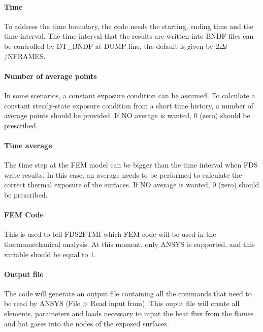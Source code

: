 \documentclass[11pt]{book}
\begin{document}
\paragraph{Time} 
To address the time boundary, the code needs the starting, ending time and the time interval. The time interval that the results are written into {\ct BNDF} files can be controlled by {\ct DT\_BNDF} at {\ct DUMP} line, the default is given by $2 \Delta t$/{\footnotesize NFRAMES}.
\paragraph{Number of average points} 
In some scenarios, a constant exposure condition can be assumed. To calculate a constant steady-state exposure condition from 
a short time history, a number of average points should be provided. If NO average is wanted, 0 (zero) should be prescribed.
\paragraph{Time average} 
The time step at the FEM model can be bigger than the time interval when FDS write results. In this case, an average needs to be performed to calculate the correct thermal exposure of the surfaces. If NO average is wanted, 0 (zero) should be prescribed.  
\paragraph{FEM Code}
This is used to tell FDS2FTMI which FEM code will be used in the thermomechanical analysis. At this moment, only A{\footnotesize NSYS} is supported, and this variable should be equal to 1.
\paragraph{Output file}
The code will generate an output file containing all the commands that need to be read by A{\footnotesize NSYS} (File > Read input from). This ouput file will create all elements, parameters and loads necessary to input the heat flux from the flames and hot gases into the nodes of the exposed surfaces. \\
\end{document}
